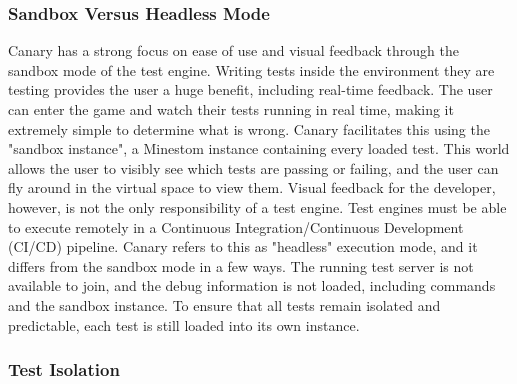 \documentclass[12pt]{article}
\begin{document}
\begin{onehalfspacing}
\subsubsection{Sandbox Versus Headless Mode}

Canary has a strong focus on ease of use and visual feedback through the
sandbox mode of the test engine. Writing tests inside the environment
they are testing provides the user a huge benefit, including real-time
feedback. The user can enter the game and watch their tests running in
real time, making it extremely simple to determine what is wrong. Canary
facilitates this using the "sandbox instance", a Minestom instance
containing every loaded test. This world allows the user to visibly see
which tests are passing or failing, and the user can fly around in the
virtual space to view them. Visual feedback for the developer, however,
is not the only responsibility of a test engine. Test engines must be
able to execute remotely in a Continuous Integration/Continuous
Development (CI/CD) pipeline. Canary refers to this as "headless"
execution mode, and it differs from the sandbox mode in a few ways. The
running test server is not available to join, and the debug information
is not loaded, including commands and the sandbox instance. To ensure
that all tests remain isolated and predictable, each test is still
loaded into its own instance.

\subsubsection{Test Isolation}


\end{onehalfspacing}
\end{document}
